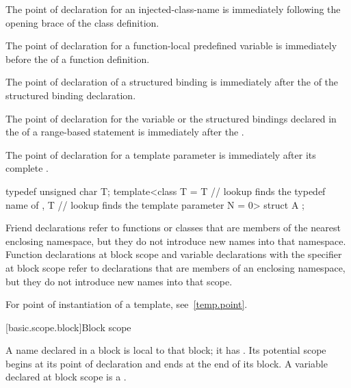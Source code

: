 \pnum
The point of declaration for an
injected-class-name is immediately following
the opening brace of the class definition.

\pnum
The point of declaration for a function-local predefined
variable is immediately before the
 of a function definition.

\pnum
The point of declaration of a structured binding
is immediately after
the  of the structured binding declaration.

\pnum
The point of declaration for the variable or the structured bindings
declared in the 
of a range-based  statement
is immediately after the .

\pnum
The point of declaration for a template parameter is immediately after its complete
. \begin{example}

\begin{codeblock}
typedef unsigned char T;
template<class T
  = T     // lookup finds the typedef name of 
  , T     // lookup finds the template parameter
    N = 0> struct A { };
\end{codeblock}
\end{example}

\pnum
\begin{note} Friend declarations refer to functions or classes that are
members of the nearest enclosing namespace, but they do not introduce
new names into that namespace. Function
declarations at block scope and variable declarations with the
 specifier at block scope refer to declarations that are
members of an enclosing namespace, but they do not introduce new names
into that scope.
\end{note}

\pnum
\begin{note}
For point of instantiation of a template, see~\ref{temp.point}.
\end{note}%
%

[basic.scope.block]{Block scope}

\pnum
{}%
%
A name declared in a block is local to that block; it has
.
Its potential scope begins at its point of
declaration and ends at the end of its block.
A variable declared at block scope is a .

